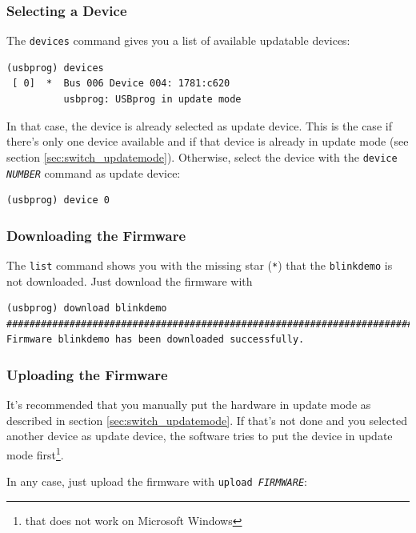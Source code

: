 \documentclass[bibtotoc,UKenglish,halfparskip,oneside,DIV12]{scrreprt}
\begin{document}
\subsubsection{Selecting a Device}

The \texttt{devices} command gives you a list of available updatable devices:

\begin{lstlisting}[style=inline]
(usbprog) devices
 [ 0]  *  Bus 006 Device 004: 1781:c620
          usbprog: USBprog in update mode
\end{lstlisting}

In that case, the device is already selected as update device. This is the case if there's only one
device available and if that device is already in update mode (see section
\vref{sec:switch_updatemode}). Otherwise, select the device with the \texttt{device \emph{NUMBER}}
command as update device:

\begin{lstlisting}[style=inline]
(usbprog) device 0
\end{lstlisting}

\subsubsection{Downloading the Firmware}

The \texttt{list} command shows you with the missing star (\texttt{*}) that the
\texttt{blinkdemo} is not downloaded. Just download the firmware with

\begin{lstlisting}[style=inline]
(usbprog) download blinkdemo
################################################################################
Firmware blinkdemo has been downloaded successfully.
\end{lstlisting}

\subsubsection{Uploading the Firmware}

It's recommended that you manually put the hardware in update mode as described in section
\vref{sec:switch_updatemode}. If that's not done and you selected another device as update device,
the software tries to put the device in update mode first\footnote{that does not work on Microsoft
Windows}.

In any case, just upload the firmware with \texttt{upload \emph{FIRMWARE}}:
\end{document}
